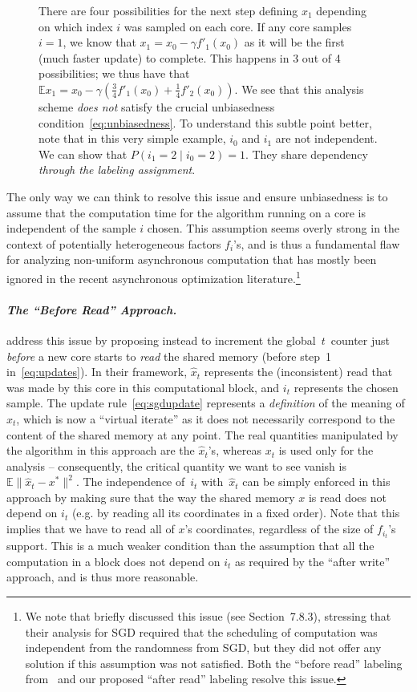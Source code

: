 \documentclass[twoside, 11pt]{article}
\newcommand{\stepsize}{\gamma}
\newcommand{\E}{\mathbb{E}}
\begin{document}
\begin{figure}
{		There are four possibilities for the next step defining $x_1$ depending on which index $i$ was sampled on each core.
		If any core samples $i=1$, we know that $x_1 = x_0 - \stepsize f'_1(x_0)$ as it will be the first (much faster update) to complete.
		This happens in 3 out of 4 possibilities; we thus have that $\E x_1 = x_0 - \stepsize (\frac{3}{4} f'_1(x_0) + \frac{1}{4} f '_2(x_0))$. We see that this analysis scheme \emph{does not} satisfy the crucial unbiasedness condition~\eqref{eq:unbiasedness}.
		To understand this subtle point better, note that in this very simple example, $i_0$ and $i_1$ are not independent. We can show that $P(i_1=2 \mid i_0=2) =1$. They share dependency \emph{through the labeling assignment}.
	}
\end{figure}

The only way we can think to resolve this issue and ensure unbiasedness is to assume that the computation time for the algorithm running on a core is independent of the sample $i$ chosen.
This assumption seems overly strong in the context of potentially heterogeneous factors $f_i$'s, and is thus a fundamental flaw for analyzing non-uniform asynchronous computation that has mostly been ignored in the recent asynchronous optimization literature.\footnote{We note that \citet{bertsekasParalle1989} briefly discussed this issue (see Section~7.8.3), stressing that their analysis for SGD required that the scheduling of computation was independent from the randomness from SGD, but they did not offer any solution if this assumption was not satisfied. Both the ``before read'' labeling from~\citet{mania} and our proposed ``after read'' labeling resolve this issue.}

\paragraph{\textit{The ``Before Read'' Approach.}}
\citet{mania} address this issue by proposing instead to increment the global~$t$~counter just \emph{before} a new core starts to \emph{read} the shared memory (before step~1 in~\ref{eq:updates}).
In their framework, $\hat{x}_t$ represents the (inconsistent) read that was made by this core in this computational block, and $i_t$ represents the chosen sample.
The update rule~\eqref{eq:sgdupdate} represents a \emph{definition} of the meaning of $x_t$, which is now a ``virtual iterate'' as it does not necessarily correspond to the content of the shared memory at any point.
The real quantities manipulated by the algorithm in this approach are the $\hat{x}_t$'s, whereas $x_t$ is used only for the analysis -- consequently, the critical quantity we want to see vanish is $\E \|\hat x_t - x^*\|^2$.
The independence of~$i_t$ with~$\hat{x}_t$ can be simply enforced in this approach by making sure that the way the shared memory $x$ is read does not depend on $i_t$ (e.g. by reading all its coordinates in a fixed order). Note that this implies that we have to read all of $x$'s coordinates, regardless of the size of $f_{i_t}$'s support.
This is a much weaker condition than the assumption that all the computation in a block does not depend on $i_t$ as required by the ``after write'' approach, and is thus more reasonable.
\end{document}
